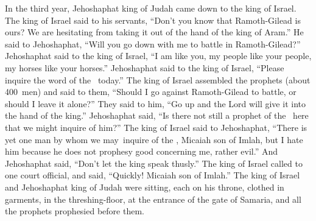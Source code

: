 \begin{inparaenum}
   In the third year, Jehoshaphat king of Judah came down to the king of Israel.%
   The king of Israel said to his servants, ``Don't you know that Ramoth-Gilead is ours? We are hesitating from taking it out of the hand of the king of Aram.''%
   He said to Jehoshaphat, ``Will you go down with me to battle in Ramoth-Gilead?'' Jehoshaphat said to the king of Israel, ``I am like you, my people like your people, my horses like your horses.''%
   Jehoshaphat said to the king of Israel, ``Please inquire the word of the \lord\ today.''%
   The king of Israel assembled the prophets (about 400~men) and said to them, ``Should I go against Ramoth-Gilead to battle, or should I leave it alone?'' They said to him, ``Go up and the Lord will give it into the hand of the king.''%
   Jehoshaphat said, ``Is there not still a prophet of the \lord\ here that we might inquire of him?''%
   The king of Israel said to Jehoshaphat, ``There is yet one man by whom we may\understood\ inquire of the \lord, Micaiah son of Imlah, but I hate him because he does not prophesy good concerning me, rather evil.'' And Jehoshaphat said, ``Don't let the king speak thusly.''%
   The king of Israel called to one court official, and said, ``Quickly! Micaiah son of Imlah.''%
   The king of Israel and Jehoshaphat king of Judah were sitting, each on his throne, clothed in garments, in the threshing-floor, at the entrance of the gate of Samaria, and all the prophets prophesied before them.%

\end{inparaenum}
